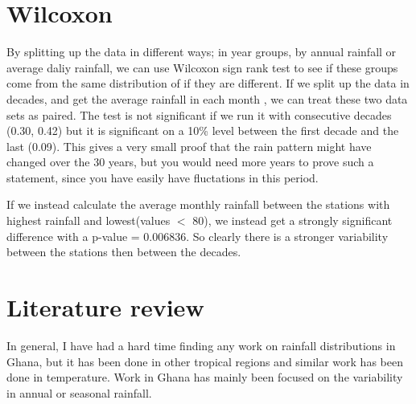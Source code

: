 \documentclass{article}
\begin{document}
	\section{Wilcoxon}
	By splitting up the data in different ways; in year groups, by annual rainfall or average daliy rainfall, we can use Wilcoxon sign rank test to see if these groups come from the same distribution of if they are different. If we split up the data in decades, and get the average rainfall in each month , we can treat these two data sets as paired. The test is not significant if we run it with consecutive decades (0.30, 0.42) but it is significant on a 10\% level between the first decade and the last (0.09). This gives a very small proof that the rain pattern might have changed over the 30 years, but you would need more years to prove such a statement, since you have easily have fluctations in this period.
	
	If we instead calculate the average monthly rainfall between the stations with highest rainfall and lowest(values $<$ 80), we instead get a strongly significant difference with a p-value = 0.006836. So clearly there is a stronger variability between the stations then between the decades.
	
	\section{Literature review}
	In general, I have had a hard time finding any work on rainfall distributions in Ghana, but it has been done in other tropical regions and similar work has been done in temperature. Work in Ghana has mainly been focused on the variability in annual or seasonal rainfall. 
	
\end{document}
